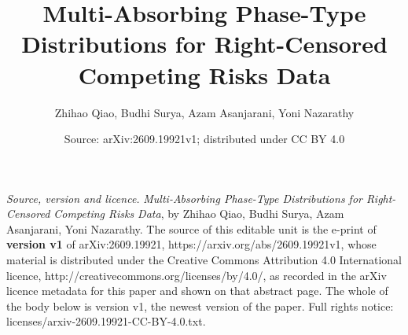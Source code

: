\documentclass[10pt,a4paper]{amsart}
\begin{document}
\title{Multi-Absorbing Phase-Type Distributions for Right-Censored Competing Risks Data}
\author{Zhihao Qiao, Budhi Surya, Azam Asanjarani, Yoni Nazarathy}
\date{Source: arXiv:2609.19921v1; distributed under CC BY 4.0}
\maketitle
\noindent\emph{Source, version and licence.} \emph{Multi-Absorbing Phase-Type Distributions for Right-Censored Competing Risks Data}, by Zhihao Qiao, Budhi Surya, Azam Asanjarani, Yoni Nazarathy. The source of this editable unit is the e-print of \textbf{version v1} of arXiv:2609.19921, https://arxiv.org/abs/2609.19921v1, whose material is distributed under the Creative Commons Attribution 4.0 International licence, http://creativecommons.org/licenses/by/4.0/, as recorded in the arXiv licence metadata for this paper and shown on that abstract page. The whole of the body below is version v1, the newest version of the paper. Full rights notice: licenses/arxiv-2609.19921-CC-BY-4.0.txt.\par\smallskip
\end{document}
